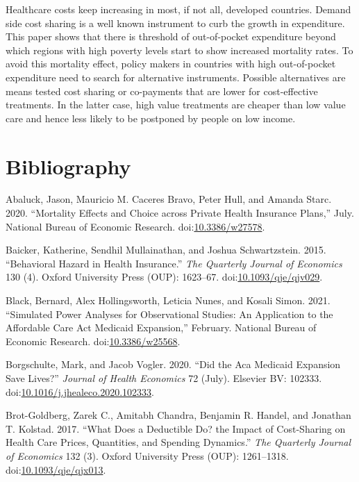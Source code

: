 \documentclass[a4paper,12pt]{article}
\begin{document}
Healthcare costs keep increasing in most, if not all, developed countries. Demand side cost sharing is a well known instrument to curb the growth in expenditure. This paper shows that there is threshold of out-of-pocket expenditure beyond which regions with high poverty levels start to show increased mortality rates. To avoid this mortality effect, policy makers in countries with high out-of-pocket expenditure need to search for alternative instruments. Possible alternatives are means tested cost sharing or co-payments that are lower for cost-effective treatments. In the latter case, high value treatments are cheaper than low value care and hence less likely to be postponed by people on low income.


\section{Bibliography}
\label{sec:org205cdb8}

\hypertarget{citeproc_bib_item_1}{Abaluck, Jason, Mauricio M. Caceres Bravo, Peter Hull, and Amanda Starc. 2020. “Mortality Effects and Choice across Private Health Insurance Plans,” July. National Bureau of Economic Research. doi:\href{https://doi.org/10.3386/w27578}{10.3386/w27578}.}

\hypertarget{citeproc_bib_item_2}{Baicker, Katherine, Sendhil Mullainathan, and Joshua Schwartzstein. 2015. “Behavioral Hazard in Health Insurance.” \textit{The Quarterly Journal of Economics} 130 (4). Oxford University Press (OUP): 1623–67. doi:\href{https://doi.org/10.1093/qje/qjv029}{10.1093/qje/qjv029}.}

\hypertarget{citeproc_bib_item_3}{Black, Bernard, Alex Hollingsworth, Leticia Nunes, and Kosali Simon. 2021. “Simulated Power Analyses for Observational Studies: An Application to the Affordable Care Act Medicaid Expansion,” February. National Bureau of Economic Research. doi:\href{https://doi.org/10.3386/w25568}{10.3386/w25568}.}

\hypertarget{citeproc_bib_item_4}{Borgschulte, Mark, and Jacob Vogler. 2020. “Did the Aca Medicaid Expansion Save Lives?” \textit{Journal of Health Economics} 72 (July). Elsevier BV: 102333. doi:\href{https://doi.org/10.1016/j.jhealeco.2020.102333}{10.1016/j.jhealeco.2020.102333}.}

\hypertarget{citeproc_bib_item_5}{Brot-Goldberg, Zarek C., Amitabh Chandra, Benjamin R. Handel, and Jonathan T. Kolstad. 2017. “What Does a Deductible Do? the Impact of Cost-Sharing on Health Care Prices, Quantities, and Spending Dynamics.” \textit{The Quarterly Journal of Economics} 132 (3). Oxford University Press (OUP): 1261–1318. doi:\href{https://doi.org/10.1093/qje/qjx013}{10.1093/qje/qjx013}.}
\end{document}
